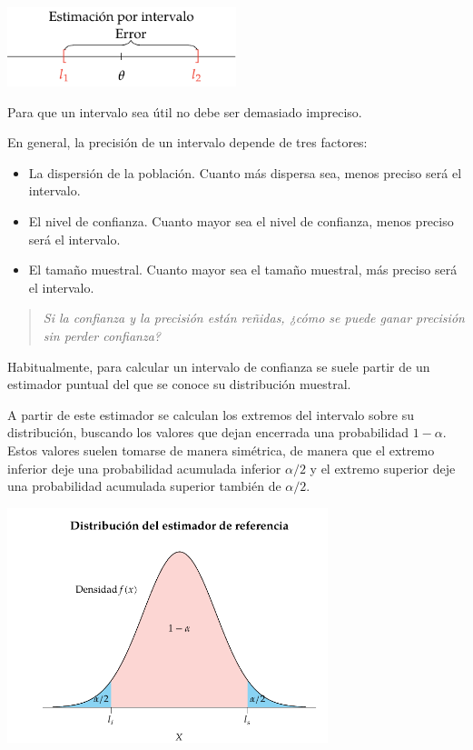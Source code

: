 \documentclass[
  a4paper,
]{scrreport}
\theoremstyle{plain}
\theoremstyle{definition}
\theoremstyle{definition}
\theoremstyle{remark}
\begin{document}
\begin{center}
\includegraphics[width=0.5\textwidth,height=\textheight]{img/estimacion/error-estimacion-intervalo.pdf}
\end{center}

Para que un intervalo sea útil no debe ser demasiado impreciso.

En general, la precisión de un intervalo depende de tres factores:

\begin{itemize}
\item
  La dispersión de la población. Cuanto más dispersa sea, menos preciso
  será el intervalo.
\item
  El nivel de confianza. Cuanto mayor sea el nivel de confianza, menos
  preciso será el intervalo.
\item
  El tamaño muestral. Cuanto mayor sea el tamaño muestral, más preciso
  será el intervalo.
\end{itemize}

\begin{quote}
\emph{Si la confianza y la precisión están reñidas, ¿cómo se puede ganar
precisión sin perder confianza?}
\end{quote}

Habitualmente, para calcular un intervalo de confianza se suele partir
de un estimador puntual del que se conoce su distribución muestral.

A partir de este estimador se calculan los extremos del intervalo sobre
su distribución, buscando los valores que dejan encerrada una
probabilidad \(1-\alpha\). Estos valores suelen tomarse de manera
simétrica, de manera que el extremo inferior deje una probabilidad
acumulada inferior \(\alpha/2\) y el extremo superior deje una
probabilidad acumulada superior también de \(\alpha/2\).

\begin{center}
\includegraphics[width=0.7\textwidth,height=\textheight]{img/estimacion/extremos-intervalos.pdf}
\end{center}
\end{document}
